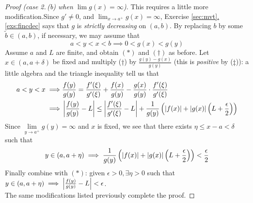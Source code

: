 \begin{proof}[Proof (case 2.\,(b) when $\lim g(x)=\infty$)]
This requires a little more modification.\footnotemark Since $g'\neq 0$, and $\lim_{x\to a^+}g(x)=\infty$, Exercise \hyperref[exs:fincdec]{\ref*{sec:mvt}.\ref*{exs:fincdec}} says that $g$ is \emph{strictly decreasing} on $(a,b)$. By replacing $b$ by some $\tilde b\in(a,b)$, if necessary, we may assume that
\[a<y<x<b\implies 0<g(x)<g(y)\tag{\ddag}\]
Assume $a$ and $L$ are finite, and obtain $(\ast)$ and $(\dag)$ as before. Let $x\in(a,a+\delta)$ be fixed and multiply ($\dag$) by $\frac{g(y)-g(x)}{g(y)}$ (this is \emph{positive} by ($\ddag$)): a little algebra and the triangle inequality tell us that 
\begin{align*}
a<y<x \implies& \frac{f(y)}{g(y)} =\frac{f'(\xi)}{g'(\xi)}+\frac{f(x)}{g(y)}- \frac{g(x)}{g(y)}\cdot\frac{f'(\xi)}{g'(\xi)}\\
\implies& \left| \frac{f(y)}{g(y)}-L\right|\le \left| \frac{f'(\xi)}{g'(\xi)}-L\right| +\frac 1{g(y)}\left(\left| f(x)\right|+\left| g(x)\right|\left(L+\frac\epsilon 2\right)\right)
\end{align*}
Since $\lim\limits_{y\to a^+}g(y)=\infty$ and $x$ is fixed, we see that there exists $\eta\le x-a<\delta$ such that
\[y\in(a,a+\eta)\implies \frac 1{g(y)}\left(\left| f(x)\right|+\left| g(x)\right|\left(L+\frac\epsilon 2\right)\right) <\frac\epsilon 2\]
Finally combine with $(\ast)$: given $\epsilon>0,\exists \eta>0$ such that $y\in(a,a+\eta)\implies \left| \frac{f(y)}{g(y)}-L\right|<\epsilon$.\\
The same modifications listed previously complete the proof.
\end{proof}





